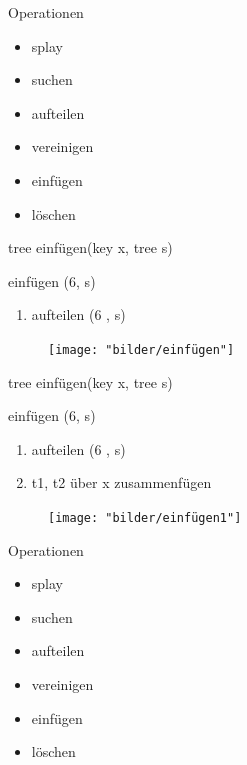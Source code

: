 \documentclass[11pt]{beamer}
\begin{document}
		\begin{frame}{Operationen}
		
		\begin{itemize}
			
			\item \color {gray} splay
			\item  suchen
			\item  aufteilen
			\item vereinigen
			\item  \color {black}  einfügen
			\item  \color {gray} löschen
		\end{itemize}
	\end{frame}		

	\begin{frame}{tree einfügen(key x, tree s)}
		\begin{block}{einfügen (6, s)}
			\begin{enumerate}
				\item aufteilen (6 ,  s)
			\end{enumerate}
		\end{block}
		\pause	
		\begin{figure}[h]
			\centering
			\texttt{[image: "bilder/einfügen"]}	
		\end{figure}	
		
	\end{frame}	

		\begin{frame}{tree einfügen(key x, tree s)}
		\begin{block}{einfügen (6, s)}
			\begin{enumerate}
				\item aufteilen (6 ,  s)
				\item t1, t2 über x zusammenfügen
			\end{enumerate}
		\end{block}
		\begin{figure}[h]
			\centering
			\texttt{[image: "bilder/einfügen1"]}	
		\end{figure}	
		
		\end{frame}	

		\begin{frame}{Operationen}
		
		\begin{itemize}
			
			\item \color {gray} splay
			\item  suchen
			\item  aufteilen
			\item vereinigen
			\item    einfügen
			\item  \color {black} löschen
		\end{itemize}
	\end{frame}		
\end{document}
